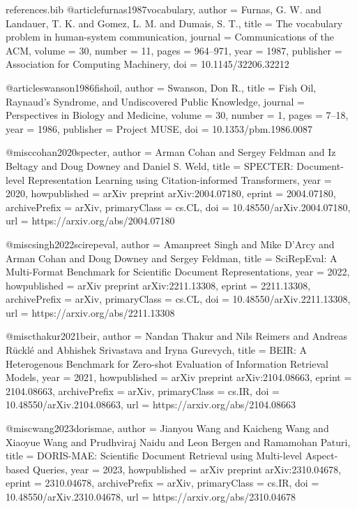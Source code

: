 \begin{filecontents*}{references.bib}
@article{furnas1987vocabulary,
  author    = {Furnas, G. W. and Landauer, T. K. and Gomez, L. M. and Dumais, S. T.},
  title     = {{The vocabulary problem in human-system communication}},
  journal   = {Communications of the ACM},
  volume    = {30},
  number    = {11},
  pages     = {964--971},
  year      = {1987},
  publisher = {Association for Computing Machinery},
  doi       = {10.1145/32206.32212}
}

@article{swanson1986fishoil,
  author    = {Swanson, Don R.},
  title     = {{Fish Oil, Raynaud's Syndrome, and Undiscovered Public Knowledge}},
  journal   = {Perspectives in Biology and Medicine},
  volume    = {30},
  number    = {1},
  pages     = {7--18},
  year      = {1986},
  publisher = {Project MUSE},
  doi       = {10.1353/pbm.1986.0087}
}

@misc{cohan2020specter,
  author        = {Arman Cohan and Sergey Feldman and Iz Beltagy and Doug Downey and Daniel S. Weld},
  title         = {{SPECTER: Document-level Representation Learning using Citation-informed Transformers}},
  year          = {2020},
  howpublished  = {arXiv preprint arXiv:2004.07180},
  eprint        = {2004.07180},
  archivePrefix = {arXiv},
  primaryClass  = {cs.CL},
  doi           = {10.48550/arXiv.2004.07180},
  url           = {https://arxiv.org/abs/2004.07180}
}

@misc{singh2022scirepeval,
  author        = {Amanpreet Singh and Mike D'Arcy and Arman Cohan and Doug Downey and Sergey Feldman},
  title         = {{SciRepEval: A Multi-Format Benchmark for Scientific Document Representations}},
  year          = {2022},
  howpublished  = {arXiv preprint arXiv:2211.13308},
  eprint        = {2211.13308},
  archivePrefix = {arXiv},
  primaryClass  = {cs.CL},
  doi           = {10.48550/arXiv.2211.13308},
  url           = {https://arxiv.org/abs/2211.13308}
}

@misc{thakur2021beir,
  author        = {Nandan Thakur and Nils Reimers and Andreas R{\"u}cklé and Abhishek Srivastava and Iryna Gurevych},
  title         = {{BEIR: A Heterogenous Benchmark for Zero-shot Evaluation of Information Retrieval Models}},
  year          = {2021},
  howpublished  = {arXiv preprint arXiv:2104.08663},
  eprint        = {2104.08663},
  archivePrefix = {arXiv},
  primaryClass  = {cs.IR},
  doi           = {10.48550/arXiv.2104.08663},
  url           = {https://arxiv.org/abs/2104.08663}
}

@misc{wang2023dorismae,
  author        = {Jianyou Wang and Kaicheng Wang and Xiaoyue Wang and Prudhviraj Naidu and Leon Bergen and Ramamohan Paturi},
  title         = {{DORIS-MAE: Scientific Document Retrieval using Multi-level Aspect-based Queries}},
  year          = {2023},
  howpublished  = {arXiv preprint arXiv:2310.04678},
  eprint        = {2310.04678},
  archivePrefix = {arXiv},
  primaryClass  = {cs.IR},
  doi           = {10.48550/arXiv.2310.04678},
  url           = {https://arxiv.org/abs/2310.04678}
}


\end{filecontents*}
